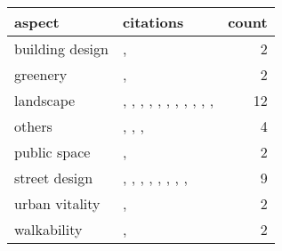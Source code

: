 \begin{table}[ht]
\centering
\begin{tabular}{llr}
  \hline
aspect & citations & count \\ 
  \hline
building design & \citet{paes_investigating_2023}, \citet{buttazzoni_urban_2022} &   2 \\ 
  greenery & \citet{huang_do_2023}, \citet{song_effect_2022} &   2 \\ 
  landscape & \citet{liu_interpretable_2023}, \citet{he_extracting_2023}, \citet{li_humanization_2023}, \citet{luo_water_2022}, \citet{luo_oppressiveness_2022}, \citet{luo_semantic_2022}, \citet{lis_how_2022}, \citet{qi_comparative_2022}, \citet{li_prediction_2022}, \citet{wei_mapping_2022}, \citet{celikors_are_2022}, \citet{hu_quantifying_2022} &  12 \\ 
  others & \citet{zhao_sensing_2023}, \citet{winz_stress_2022}, \citet{soto_public_2022}, \citet{li_understanding_2022} &   4 \\ 
  public space & \citet{lin_modelling_2023}, \citet{jaalama_auditing_2022} &   2 \\ 
  street design & \citet{yilmaz_role_2023}, \citet{son_analysis_2023}, \citet{su_measuring_2023}, \citet{wang_adolescents_2023}, \citet{qiu_subjective_2023}, \citet{li_measuring_2022}, \citet{balasubramanian_aesthetics_2022}, \citet{wang_measuring_2022}, \citet{qiu_subjective_2022} &   9 \\ 
  urban vitality & \citet{huang_collaborative_2023}, \citet{wu_using_2023} &   2 \\ 
  walkability & \citet{li_integrating_2023}, \citet{liao_individuals_2022} &   2 \\ 
   \hline
\end{tabular}
\end{table}
